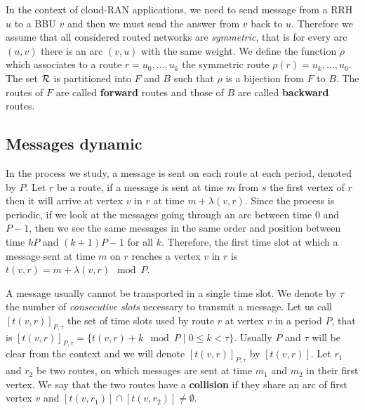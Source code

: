 \documentclass[10pt, conference, letterpaper]{IEEEtran}
\begin{document}
   In the context of cloud-RAN applications, we need to send message from a RRH $u$ to a BBU $v$ and then 
      we must send the answer from $v$ back to $u$. Therefore we assume that all considered routed networks 
      are \emph{symmetric}, that is for every arc $(u,v)$ there is an arc $(v,u)$ with the same weight.
      We define the function $\rho$ which associates to a route $r = u_0,\dots,u_k$ the symmetric route $\rho(r) = u_k,\dots,u_0$.
      The set ${\cal R}$ is partitioned into $F$ and $B$ such that $\rho$ is a bijection from $F$ to $B$.
      The routes of $F$ are called \textbf{forward} routes and those of $B$ are called \textbf{backward} routes.
%       
      


   \subsection{Messages dynamic}
      
      
      In the process we study, a message is sent on each route at each period, denoted by $P$.
      Let $r$ be a route, if a message is sent at time $m$ from $s$ the first vertex of $r$ then it will arrive at vertex $v$ in $r$ at time $m + \lambda(v,r)$. Since the process is periodic, if we look at the messages going through an arc between time $0$ and $P-1$, then we see the same messages in the same order and position between time $kP$ and $(k+1)P -1$ for all $k$. 
      Therefore, the first time slot at which a message sent at time $m$ on $r$ reaches a vertex $v$ in $r$ is $t(v,r) = m + \lambda(v,r) \mod P$. 
      
      A message usually cannot be transported in a single time slot. We denote by $\tau$ the number 
      of \emph{consecutive slots} necessary to transmit a message. Let us call $[t(v,r)]_{P,\tau}$ the set of time slots used by route $r$ at vertex $v$ in a period $P$, that is $[t(v,r)]_{P,\tau} = \{t(v,r) + k \mod P \mid 0 \leq k < \tau \}$. Usually $P$ and $\tau$ will be clear from the context and we will denote $[t(v,r)]_{P,\tau}$ by $[t(v,r)]$.
      Let $r_1$ and $r_2$ be two routes, on which messages are sent at time $m_1$ and $m_2$ in their first vertex.
      We say that the two routes have a {\bf collision} if they share an arc of first vertex $v$ and $[t(v,r_{1})] \cap [t(v,r_{2})] \neq \emptyset$.
      
\end{document}
